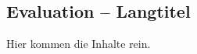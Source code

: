 \begin{showEvaluation}%
\chapter[Evaluation -- Kurztitel für Inhaltsverzeichnis und Kolumnentitel]{Evaluation -- Langtitel}%
\label{chap:Evaluation}
%
Hier kommen die Inhalte rein.
%
%
\end{showEvaluation}%